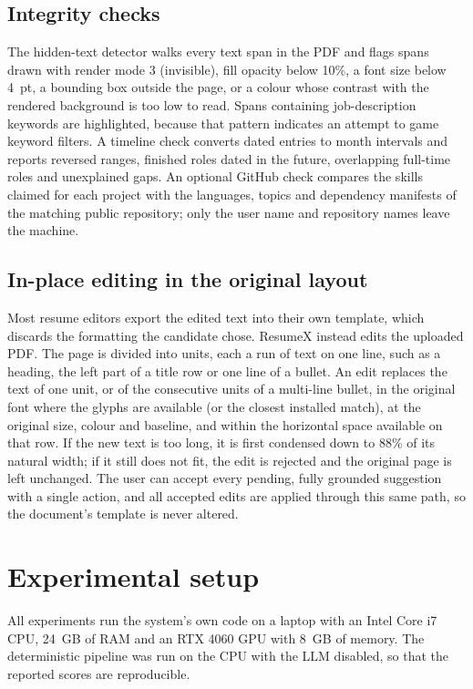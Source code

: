 \documentclass[3p,times,procedia]{elsarticle}
\begin{document}
\subsection{Integrity checks}
The hidden-text detector walks every text span in the PDF and flags spans drawn with render mode 3 (invisible), fill opacity below 10\%, a font size below 4~pt, a bounding box outside the page, or a colour whose contrast with the rendered background is too low to read. Spans containing job-description keywords are highlighted, because that pattern indicates an attempt to game keyword filters. A timeline check converts dated entries to month intervals and reports reversed ranges, finished roles dated in the future, overlapping full-time roles and unexplained gaps. An optional GitHub check compares the skills claimed for each project with the languages, topics and dependency manifests of the matching public repository; only the user name and repository names leave the machine.

\subsection{In-place editing in the original layout}
Most resume editors export the edited text into their own template, which discards the formatting the candidate chose. ResumeX instead edits the uploaded PDF. The page is divided into units, each a run of text on one line, such as a heading, the left part of a title row or one line of a bullet. An edit replaces the text of one unit, or of the consecutive units of a multi-line bullet, in the original font where the glyphs are available (or the closest installed match), at the original size, colour and baseline, and within the horizontal space available on that row. If the new text is too long, it is first condensed down to 88\% of its natural width; if it still does not fit, the edit is rejected and the original page is left unchanged. The user can accept every pending, fully grounded suggestion with a single action, and all accepted edits are applied through this same path, so the document's template is never altered.

\section{Experimental setup}
\label{sec:setup}

All experiments run the system's own code on a laptop with an Intel Core i7 CPU, 24~GB of RAM and an RTX 4060 GPU with 8~GB of memory. The deterministic pipeline was run on the CPU with the LLM disabled, so that the reported scores are reproducible.
\end{document}
